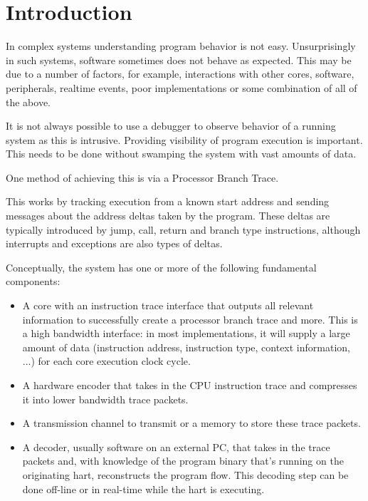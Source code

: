 \chapter{Introduction}
\label{sec:intro}

In complex systems understanding program behavior is not easy.
Unsurprisingly in such systems, software sometimes does not behave as
expected. This may be due to a number of factors, for example,
interactions with other cores, software, peripherals, realtime
events, poor implementations or some combination of all of the above.

It is not always possible to use a debugger to observe behavior of a
running system as this is intrusive.  Providing visibility of program
execution is important.  This needs to be done without swamping the
system with vast amounts of data.

One method of achieving this is via a Processor Branch Trace.

This works by tracking execution from a known start address and sending
messages about the address deltas taken by the program. These deltas are
typically introduced by jump, call, return and branch type instructions,
although interrupts and exceptions are also types of deltas.

Conceptually, the system has one or more of the following fundamental components:

\begin{itemize}
  \item
    A core with an instruction trace interface that outputs all relevant
    information to successfully create a processor branch trace and more.
    This is a high bandwidth interface: in most implementations, it will supply
    a large amount of data (instruction address, instruction type, context information, ...)
    for each core execution clock cycle.
  \item
    A hardware encoder that takes in the CPU instruction trace and compresses
    it into lower bandwidth trace packets.
  \item
    A transmission channel to transmit or a memory to store these trace packets.
  \item
    A decoder, usually software on an external PC, that takes in the trace
    packets and, with knowledge of the program binary that's running on the
    originating hart, reconstructs the program flow. This decoding step can
    be done off-line or in real-time while the hart is executing.
\end{itemize}

